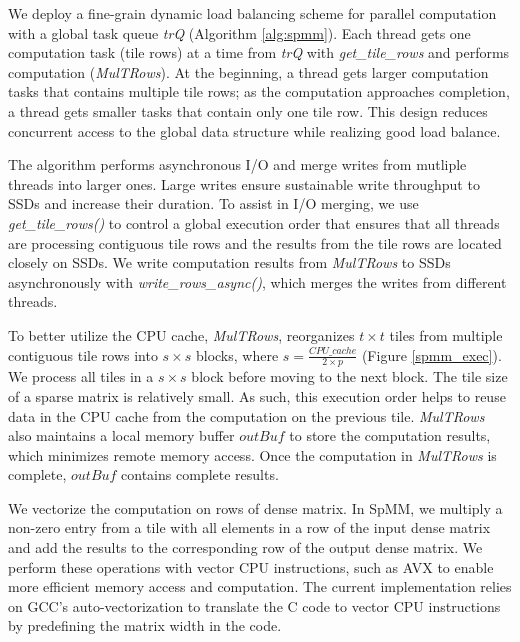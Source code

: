We deploy a fine-grain dynamic load balancing scheme for parallel computation
with a global task queue \textit{trQ} (Algorithm \ref{alg:spmm}). Each thread
gets one computation task (tile rows) at a time from \textit{trQ} with
\textit{get\_tile\_rows} and performs computation (\textit{MulTRows}).
At the beginning, a thread gets larger computation tasks that contains multiple
tile rows; as the computation approaches completion, a thread gets smaller
tasks that contain only one tile row. This design reduces concurrent access to
the global data structure while realizing good load balance.

The algorithm performs asynchronous I/O and merge writes from mutliple threads
into larger ones. Large writes ensure sustainable write throughput to SSDs and
increase their duration. To assist in I/O merging, we use
\textit{get\_tile\_rows()} to control a global execution
order that ensures that all threads are processing contiguous tile rows and
the results from the tile rows are located closely on SSDs.
We write computation results from \textit{MulTRows} to SSDs
asynchronously with \textit{write\_rows\_async()}, which merges the writes
from different threads.

To better utilize the CPU cache, \textit{MulTRows}, 
reorganizes $t \times t$
tiles from multiple contiguous tile rows into $s \times s$ blocks, where
$s = \frac{CPU\_cache}{2 \times p}$ (Figure \ref{spmm_exec}). We process all
tiles in a $s \times s$ block before moving to the next block. The tile size
of a sparse matrix is relatively small. As such, this execution order helps to
reuse data in the CPU cache from the computation on the previous tile.
\textit{MulTRows} also maintains
a local memory buffer $outBuf$ to store the computation results,
which minimizes remote memory access. Once the computation in \textit{MulTRows}
is complete, $outBuf$ contains complete results.

We vectorize the computation on rows of dense matrix.
In SpMM, we multiply a non-zero entry from a tile with all elements in
a row of the input dense matrix and add the results to the corresponding row
of the output dense matrix.
We perform these operations with vector CPU instructions, such as
AVX \cite{avx} to enable more efficient memory access and computation.
The current implementation relies on GCC's auto-vectorization
to translate the C code to vector CPU instructions by predefining the matrix
width in the code.

